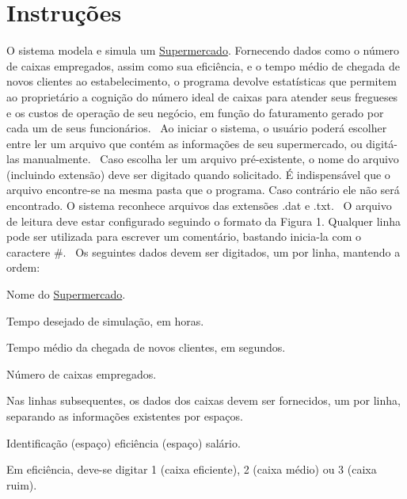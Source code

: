 \hypertarget{index_intro_sec}{}\section{Instruções}\label{index_intro_sec}
O sistema modela e simula um \hyperlink{class_supermercado}{Supermercado}. Fornecendo dados como o número de caixas empregados, assim como sua eficiência, e o tempo médio de chegada de novos clientes ao estabelecimento, o programa devolve estatísticas que permitem ao proprietário a cognição do número ideal de caixas para atender seus fregueses e os custos de operação de seu negócio, em função do faturamento gerado por cada um de seus funcionários.~\newline
 Ao iniciar o sistema, o usuário poderá escolher entre ler um arquivo que contém as informações de seu supermercado, ou digitá-\/las manualmente.~\newline
 Caso escolha ler um arquivo pré-\/existente, o nome do arquivo (incluindo extensão) deve ser digitado quando solicitado. É indispensável que o arquivo encontre-\/se na mesma pasta que o programa. Caso contrário ele não será encontrado. O sistema reconhece arquivos das extensões .dat e .txt.~\newline
 O arquivo de leitura deve estar configurado seguindo o formato da Figura 1. Qualquer linha pode ser utilizada para escrever um comentário, bastando inicia-\/la com o caractere \#.~\newline
 Os seguintes dados devem ser digitados, um por linha, mantendo a ordem\+:
\begin{DoxyItemize}
\item Nome do \hyperlink{class_supermercado}{Supermercado}.
\item Tempo desejado de simulação, em horas.
\item Tempo médio da chegada de novos clientes, em segundos.
\item Número de caixas empregados.
\item Nas linhas subsequentes, os dados dos caixas devem ser fornecidos, um por linha, separando as informações existentes por espaços.
\item Identificação (espaço) eficiência (espaço) salário.
\item Em eficiência, deve-\/se digitar 1 (caixa eficiente), 2 (caixa médio) ou 3 (caixa ruim).
\end{DoxyItemize}

